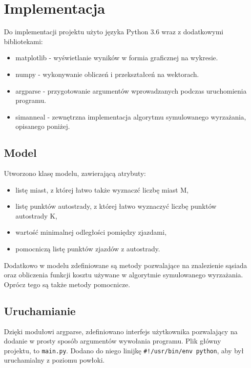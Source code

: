\documentclass[a4paper]{article}
\begin{document}
\section{Implementacja}

Do implementacji projektu użyto języka Python 3.6 wraz z dodatkowymi bibliotekami:
\begin{itemize}
\item matplotlib - wyświetlanie wyników w formia graficznej na wykresie.
\item numpy - wykonywanie obliczeń i przekształceń na wektorach.
\item argparse - przygotowanie argumentów wprowadzanych podczas uruchomienia programu.
\item simanneal - zewnętrzna implementacja algorytmu symulowanego wyrzażania, opisanego poniżej.
\end{itemize}

\subsection{Model}

Utworzono klasę modelu, zawierającą atrybuty:
\begin{itemize}
\item listę miast, z której łatwo także wyznaczć liczbę miast M,
\item listę punktów autostrady, z której łatwo wyznaczyć liczbę punktów autostrady K,
\item wartość minimalnej odległości pomiędzy zjazdami,
\item pomocniczą listę punktów zjazdów z autostrady.
\end{itemize}

Dodatkowo w modelu zdefiniowane są metody pozwalające na znalezienie sąsiada oraz obliczenia funkcji kosztu używane w algorytmie symulowanego wyrzażania. Oprócz tego są także metody pomocnicze.

\subsection{Uruchamianie}

Dzięki modułowi argparse, zdefiniowano interfejs użytkownika pozwalający na dodanie w prosty sposób argumentów wywołania programu. Plik główny projektu, to \texttt{main.py}. Dodano do niego linijkę \texttt{\#!/usr/bin/env python}, aby był uruchamialny z poziomu powłoki.
\end{document}
